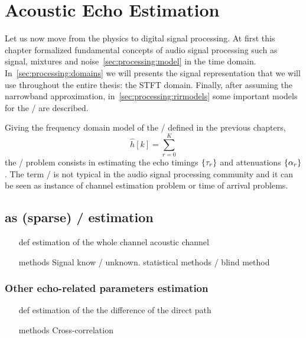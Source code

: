 \chapter{Acoustic Echo Estimation}\label{chap:estimation}
\vspace{-2.5em}
 Let us now move from the physics to digital signal processing.
At first this chapter formalized fundamental concepts of audio signal processing such as signal, mixtures and noise~\cref{sec:processing:model} in the time domain.
In~\cref{sec:processing:domains} we will presents the signal representation that we will use throughout the entire thesis: the STFT domain.
Finally, after assuming the narrowband approximation, in~\cref{sec:processing:rirmodels} some important models for the \RIR/ are described.

Giving the frequency domain model of the \RIR/ defined in the previous chapters,
\begin{equation}
    \hat{h}[k] = \sum_{r=0}^K
\end{equation}
the \AER/ problem consists in estimating the echo timings $\kbrace{\tau_r}$ and attenuations $\kbrace{\alpha_r}$.
The term \AER/ is not typical in the audio signal processing community and it can be seen as instance of
channel estimation problem or time of arrival problems.

\section{as (sparse) \RIR/ estimation}
\begin{itemize}
    \item[def] estimation of the whole channel acoustic channel
    \item[methods] Signal know \vs/ unknown. statistical methods \vs/ blind method
\end{itemize}

\subsection{Other echo-related parameters estimation}
\begin{itemize}
    \item[def] estimation of the the difference of the direct path
    \item[methods] Cross-correlation
\end{itemize}

